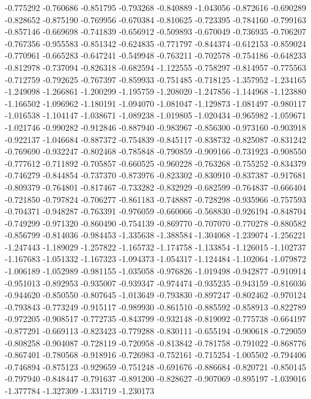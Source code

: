 -0.775292
-0.760686
-0.851795
-0.793268
-0.840889
-1.043056
-0.872616
-0.690289
-0.828652
-0.875190
-0.769956
-0.670384
-0.810625
-0.723395
-0.784160
-0.799163
-0.857146
-0.669698
-0.741839
-0.656912
-0.509893
-0.670049
-0.736935
-0.706207
-0.767356
-0.955583
-0.851342
-0.624835
-0.771797
-0.844374
-0.612153
-0.859024
-0.770961
-0.665283
-0.647241
-0.549948
-0.763211
-0.702578
-0.754186
-0.648233
-0.812978
-0.737094
-0.826318
-0.682594
-1.122555
-0.758297
-0.814957
-0.775563
-0.712759
-0.792625
-0.767397
-0.859933
-0.751485
-0.718125
-1.357952
-1.234165
-1.249098
-1.266861
-1.200299
-1.195759
-1.208020
-1.247856
-1.144968
-1.123880
-1.166502
-1.096962
-1.180191
-1.094070
-1.081047
-1.129873
-1.081497
-0.980117
-1.016538
-1.104147
-1.038671
-1.089238
-1.019805
-1.020434
-0.965982
-1.059671
-1.021746
-0.990282
-0.912846
-0.887940
-0.983967
-0.856300
-0.973160
-0.903918
-0.922137
-1.046684
-0.887372
-0.754839
-0.845117
-0.838732
-0.825087
-0.831242
-0.769690
-0.932247
-0.802468
-0.785848
-0.790859
-0.909166
-0.731923
-0.908550
-0.777612
-0.711892
-0.705857
-0.660525
-0.960228
-0.763268
-0.755252
-0.834379
-0.746279
-0.844854
-0.737370
-0.873976
-0.823302
-0.830910
-0.837387
-0.917681
-0.809379
-0.764801
-0.817467
-0.733282
-0.832929
-0.682599
-0.764837
-0.666404
-0.721850
-0.797824
-0.706277
-0.861183
-0.748887
-0.728298
-0.935966
-0.757593
-0.704371
-0.948287
-0.763391
-0.976059
-0.660066
-0.568830
-0.926194
-0.848704
-0.749299
-0.971320
-0.860490
-0.754139
-0.869770
-0.707070
-0.770278
-0.880582
-0.856799
-0.814036
-0.984453
-1.335638
-1.388584
-1.304068
-1.239074
-1.256221
-1.247443
-1.189029
-1.257822
-1.165732
-1.174758
-1.133854
-1.126015
-1.102737
-1.167683
-1.051332
-1.167323
-1.094373
-1.054317
-1.124484
-1.102064
-1.079872
-1.006189
-1.052989
-0.981155
-1.035058
-0.976826
-1.019498
-0.942877
-0.910914
-0.951013
-0.892953
-0.935007
-0.939347
-0.974474
-0.935235
-0.943159
-0.816036
-0.944620
-0.850550
-0.807645
-1.013649
-0.793830
-0.897247
-0.802462
-0.970124
-0.793843
-0.773249
-0.915117
-0.989930
-0.861510
-0.885592
-0.858913
-0.822789
-0.972205
-0.908517
-0.772735
-0.843799
-0.932148
-0.819092
-0.775738
-0.664197
-0.877291
-0.669113
-0.823423
-0.779288
-0.830111
-0.655194
-0.900618
-0.729059
-0.808258
-0.904087
-0.728119
-0.720958
-0.813842
-0.781758
-0.791022
-0.868776
-0.867401
-0.780568
-0.918916
-0.726983
-0.752161
-0.715254
-1.005502
-0.794406
-0.746894
-0.875123
-0.929659
-0.751248
-0.691676
-0.886684
-0.820721
-0.850145
-0.797940
-0.848447
-0.791637
-0.891200
-0.828627
-0.907069
-0.895197
-1.039016
-1.377784
-1.327309
-1.331719
-1.230173
